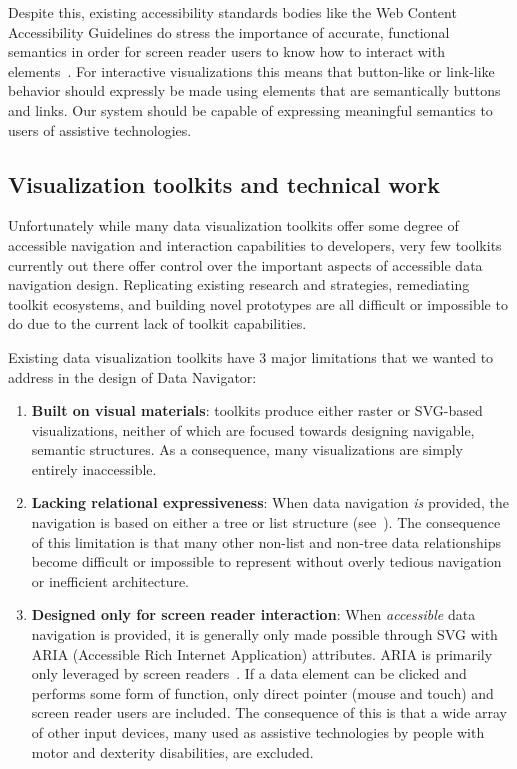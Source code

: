 \documentclass[12pt]{cmuthesis}
\begin{document}
Despite this, existing accessibility standards bodies like the Web Content Accessibility Guidelines do stress the importance of accurate, functional semantics in order for screen reader users to know how to interact with elements~\cite{WAI2021Semantics}. For interactive visualizations this means that button-like or link-like behavior should expressly be made using elements that are semantically buttons and links. Our system should be capable of expressing meaningful semantics to users of assistive technologies.

\subsection{Visualization toolkits and technical work}
Unfortunately while many data visualization toolkits offer some degree of accessible navigation and interaction capabilities to developers, very few toolkits currently out there offer control over the important aspects of accessible data navigation design. Replicating existing research and strategies, remediating toolkit ecosystems, and building novel prototypes are all difficult or impossible to do due to the current lack of toolkit capabilities.

Existing data visualization toolkits have 3 major limitations that we wanted to address in the design of Data Navigator:
\begin{enumerate}
  \itemsep-0.4em
  \item \textbf{Built on visual materials}: toolkits produce either raster or SVG-based visualizations, neither of which are focused towards designing navigable, semantic structures. As a consequence, many visualizations are simply entirely inaccessible.
  \item \textbf{Lacking relational expressiveness}: When data navigation \textit{is} provided, the navigation is based on either a tree or list structure (see~). The consequence of this limitation is that many other non-list and non-tree data relationships become difficult or impossible to represent without overly tedious navigation or inefficient architecture.
  \item \textbf{Designed only for screen reader interaction}: When \textit{accessible} data navigation is provided, it is generally only made possible through SVG with ARIA (Accessible Rich Internet Application) attributes. ARIA is primarily only leveraged by screen readers~\cite{WAI2017ARIA}. If a data element can be clicked and performs some form of function, only direct pointer (mouse and touch) and screen reader users are included. The consequence of this is that a wide array of other input devices, many used as assistive technologies by people with motor and dexterity disabilities, are excluded.
\end{enumerate}
\end{document}
